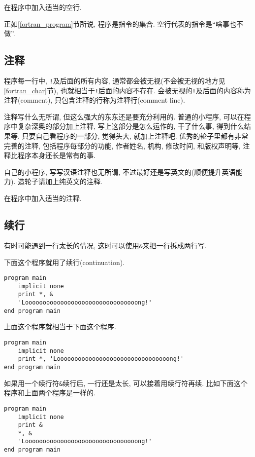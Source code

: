 \begin{convention}
    在程序中加入适当的空行.
\end{convention}

正如\ref{fortran_program}节所说, 程序是指令的集合. 空行代表的指令是``啥事也不做''.

\subsection{注释}

程序每一行中, \texttt{!}及后面的所有内容, 通常都会被无视(不会被无视的地方见\ref{fortran_char}节), 也就相当于\texttt{!}后面的内容不存在. 会被无视的\texttt{!}及后面的内容称为注释(comment), 只包含注释的行称为注释行(comment line).

注释写什么无所谓, 但这么强大的东东还是要充分利用的. 普通的小程序, 可以在程序中复杂深奥的部分加上注释, 写上这部分是怎么运作的, 干了什么事, 得到什么结果等. 只要自己看程序的一部分, 觉得头大, 就加上注释吧. 优秀的轮子里都有非常完善的注释, 包括程序每部分的功能, 作者姓名, 机构, 修改时间, 和版权声明等, 注释比程序本身还长是常有的事.

自己的小程序, 写写汉语注释也无所谓, 不过最好还是写英文的(顺便提升英语能力). 造轮子请加上纯英文的注释.

\begin{convention}
    在程序中加入适当的注释.
\end{convention}

\subsection{续行}

有时可能遇到一行太长的情况, 这时可以使用\texttt{\&{}}来把一行拆成两行写.

下面这个程序就用了续行(continuation).
\begin{lstlisting}
program main
    implicit none
    print *, &
    'Loooooooooooooooooooooooooooooooong!'
end program main
\end{lstlisting}
上面这个程序就相当于下面这个程序.
\begin{lstlisting}
program main
    implicit none
    print *, 'Loooooooooooooooooooooooooooooooong!'
end program main
\end{lstlisting}

如果用一个续行符\texttt{\&{}}续行后, 一行还是太长, 可以接着用续行符再续. 比如下面这个程序和上面两个程序是一样的.
\begin{lstlisting}
program main
    implicit none
    print &
    *, &
    'Loooooooooooooooooooooooooooooooong!'
end program main
\end{lstlisting}

